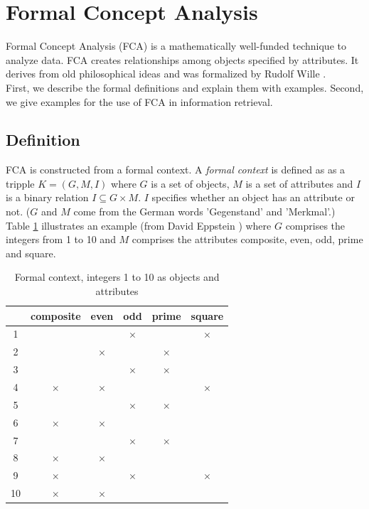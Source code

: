 \documentclass[11pt]{report}
\begin{document}
\section{Formal Concept Analysis}
\label{Formal Concept Analysis}

Formal Concept Analysis (FCA) is a mathematically well-funded technique to analyze data. FCA creates relationships among objects specified by attributes. It derives from old philosophical ideas and was formalized by Rudolf Wille \cite{Ganter2012}. \\

First, we describe the formal definitions and explain them with examples. Second, we give examples for the use of FCA in information retrieval. \\

\subsection{Definition}

FCA is constructed from a formal context. A \textit{formal context} is defined as as a tripple $K = (G, M, I)$ where $G$ is a set of objects, $M$ is a set of attributes and $I$ is a binary relation $I \subseteq G \times M$. $I$ specifies whether an object has an attribute or not. ($G$ and $M$ come from the German words 'Gegenstand' and 'Merkmal'.) \\

Table \ref{table:example} illustrates an example (from David Eppstein \cite{fcaexample}) where $G$ comprises the integers from 1 to 10 and $M$ comprises the attributes composite, even, odd, prime and square. \\


\begin{table}[h]
\caption{Formal context, integers 1 to 10 as objects and attributes}
\label{table:example}
\centering

\def\arraystretch{1.2}%
\begin{tabular}{ | c | c c c c c |}
\hline
  & composite & even & odd & prime & square\\
\hline

1 & & & $\times$ & &$\times$\\ 
2 & & $\times$ & & $\times$ &\\
3 & & & $\times$ & $\times$ &\\ 
4 & $\times$ & $\times$ & & & $\times$\\
5 & & & $\times$ & $\times$ &\\
6 & $\times$ & $\times$ & & &\\
7 & & & $\times$ & $\times$ &\\ 
8 & $\times$ & $\times$ & & &\\
9 & $\times$ & & $\times$ & & $\times$\\
10 & $\times$ & $\times$ & & &\\ \hline


\end{tabular}
\end{table}
\end{document}

